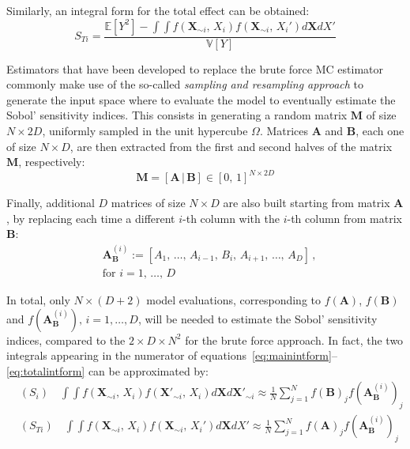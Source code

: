 \noindent
Similarly, an integral form for the total effect can be obtained:
%
\begin{equation}\label{eq:totalintform}
    S_{Ti} = \frac{\mathbb{E}[Y^2] - \int\int f(\mathbf{X}_{\sim i},\, X_i)f(\mathbf{X}_{\sim i},\, X_i')d\mathbf{X}dX'}{\mathbb{V}[Y]}
\end{equation}

\vspace{0.2cm}
Estimators that have been developed to replace the brute force MC estimator commonly make use of the so-called \textit{sampling and resampling approach} to generate the input space where to evaluate the model to eventually estimate the Sobol' sensitivity indices. This consists in generating a random matrix $\mathbf{M}$ of size $N\times 2D$, uniformly sampled in the unit hypercube $\Omega$. Matrices $\mathbf{A}$ and $\mathbf{B}$, each one of size $N\times D$, are then extracted from the first and second halves of the matrix $\mathbf{M}$, respectively:
%
\begin{equation}
    \mathbf{M} =  [\mathbf{A}\,|\,\mathbf{B}]\in [0,\,1]^{N\times 2D}
\end{equation}

\noindent
Finally, additional $D$ matrices of size $N\times D$ are also built starting from matrix $\mathbf{A}$, by replacing each time a different $i$-th column with the $i$-th column from matrix $\mathbf{B}$:
%
\begin{align}
    & \mathbf{A}_{\mathbf{B}}^{(i)} := [A_1,\,\dots,\,A_{i-1},\,B_i,\,A_{i+1},\,\dots,\,A_{D}]\,, \\
    & \text{for}\,\,i=1,\,\dots,\,D
\end{align}

\noindent
In total, only $N\times (D + 2)$ model evaluations, corresponding to $f(\mathbf{A})$, $f(\mathbf{B})$ and $f(\mathbf{A}_{\mathbf{B}}^{(i)}),\,i=1,\dots,D$, will be needed to estimate the Sobol' sensitivity indices, compared to the $2\times D\times N^2$ for the brute force approach. In fact, the two integrals appearing in the numerator of equations~\eqref{eq:mainintform}--\eqref{eq:totalintform} can be approximated by:
%
\begin{align}
    & (S_{i})\quad \int\int f(\mathbf{X}_{\sim i},\, X_i)f(\mathbf{X'}_{\sim i},\, X_i)d\mathbf{X}d\mathbf{X'}_{\sim i} \approx \frac{1}{N}\sum_{j=1}^{N} f(\mathbf{B})_{j}f(\mathbf{A}_{\mathbf{B}}^{(i)})_{j} \\
    & (S_{Ti})\quad \int\int f(\mathbf{X}_{\sim i},\, X_i)f(\mathbf{X}_{\sim i},\, X_i')d\mathbf{X}dX' \approx \frac{1}{N}\sum_{j=1}^{N} f(\mathbf{A})_{j}f(\mathbf{A}_{\mathbf{B}}^{(i)})_{j}
\end{align}

